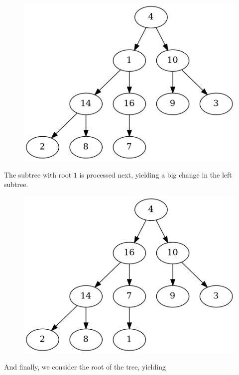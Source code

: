 \begin{figure}[H]
\centering
\includegraphics[scale=0.5]{images/heapsort_13.png}
\end{figure}

The subtree with root $1$ is processed next, yielding a big change in the left subtree.

\begin{figure}[H]
\centering
\includegraphics[scale=0.5]{images/heapsort_14.png}
\end{figure}

And finally, we consider the root of the tree, yielding

